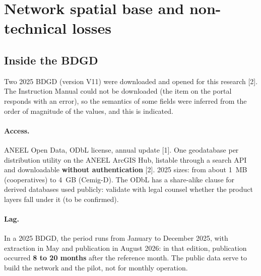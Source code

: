 
\section{Network spatial base and non-technical losses}

\subsection*{Inside the BDGD}

Two 2025 BDGD (version V11) were downloaded and opened for this research
[2]. The Instruction Manual could not be downloaded (the item on the portal
responds with an error), so the semantics of some fields were inferred from the
order of magnitude of the values, and this is indicated.

\paragraph{Access.} ANEEL Open Data, ODbL license, annual update
[1]. One geodatabase per distribution utility on the ANEEL ArcGIS Hub, listable
through a search API and downloadable \textbf{without authentication} [2]. 2025
sizes: from about 1~MB (cooperatives) to 4~GB (Cemig-D). The ODbL has a
share-alike clause for derived databases used publicly:
validate with legal counsel whether the product layers fall under it (to be confirmed).

\paragraph{Lag.} In a 2025 BDGD, the period runs from January to
December 2025, with extraction in May and publication in August 2026: in that
edition, publication occurred \textbf{8 to 20 months} after the reference
month. The public data serve to
build the network and the pilot, not for monthly operation.

